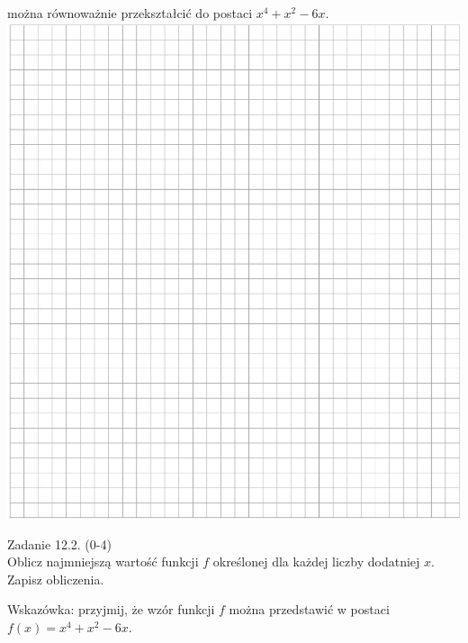 \documentclass[10pt]{article}
\begin{document}
można równoważnie przekształcić do postaci \(x^{4}+x^{2}-6 x\).\\
\includegraphics[max width=\textwidth, center]{2024_11_21_f1ecc00f5c4ab21f0d04g-20}

Zadanie 12.2. (0-4)\\
Oblicz najmniejszą wartość funkcji \(f\) określonej dla każdej liczby dodatniej \(x\). Zapisz obliczenia.

Wskazówka: przyjmij, że wzór funkcji \(f\) można przedstawić w postaci \(f(x)=x^{4}+x^{2}-6 x\).\\
\(\qquad\)
\end{document}
